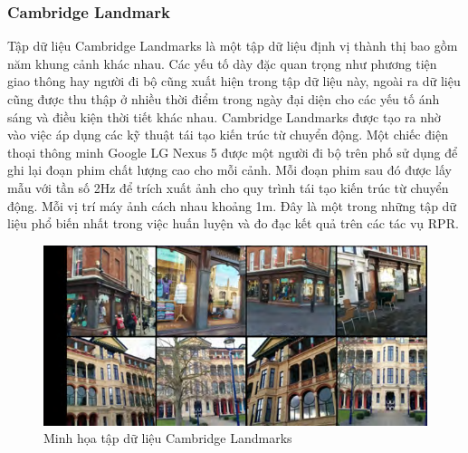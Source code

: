 \subsubsection*{Cambridge Landmark}
Tập dữ liệu Cambridge Landmarks \cite{kendall2016posenet} là một tập dữ liệu định vị thành thị bao gồm năm khung cảnh khác nhau. Các yếu tố dày đặc quan trọng như phương tiện giao thông hay người đi bộ cũng xuất hiện trong tập dữ liệu này, ngoài ra dữ liệu cũng được thu thập ở nhiều thời điểm trong ngày đại diện cho các yếu tố ánh sáng và điều kiện thời tiết khác nhau. Cambridge Landmarks được tạo ra nhờ vào việc áp dụng các kỹ thuật tái tạo kiến trúc từ chuyển động. Một chiếc điện thoại thông minh Google LG Nexus 5 được một người đi bộ trên phố sử dụng để ghi lại đoạn phim chất lượng cao cho mỗi cảnh. Mỗi đoạn phim sau đó được lấy mẫu với tần số 2Hz để trích xuất ảnh cho quy trình tái tạo kiến trúc từ chuyển động. Mỗi vị trí máy ảnh cách nhau khoảng 1m. Đây là một trong những tập dữ liệu phổ biến nhất trong việc huấn luyện và đo đạc kết quả trên các tác vụ RPR.
\begin{figure}[H]
    \centering
    \includegraphics[width=\textwidth]{pics/Chapter2/cambridge.png}
    \caption{Minh họa tập dữ liệu Cambridge Landmarks \cite{kendall2016posenet}}
\end{figure}
